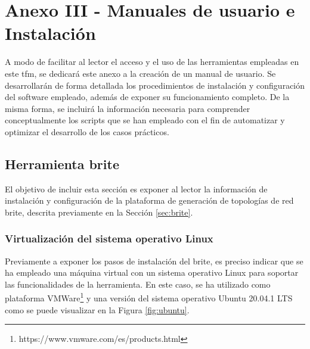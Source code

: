 \chapter{Anexo III - Manuales de usuario e Instalación}

A modo de facilitar al lector el acceso y el uso de las herramientas empleadas en este \gls{tfm}, se dedicará este anexo a la creación de un manual de usuario. Se desarrollarán de forma detallada los procedimientos de instalación y configuración del software empleado, además de exponer su funcionamiento completo. De la misma forma, se incluirá la información necesaria para comprender conceptualmente los scripts que se han empleado con el fin de automatizar y optimizar el desarrollo de los casos prácticos.




\section{Herramienta \acrshort{brite}}
\label{sec:manualbrite}

El objetivo de incluir esta sección es exponer al lector la información de instalación y configuración de la plataforma de generación de topologías de red \gls{brite}, descrita previamente en la Sección \ref{sec:brite}.

\subsection{Virtualización del sistema operativo Linux}
Previamente a exponer los pasos de instalación del \gls{brite}, es preciso indicar que se ha empleado una máquina virtual con un sistema operativo Linux para soportar las funcionalidades de la herramienta. En este caso, se ha utilizado como plataforma VMWare\footnote{https://www.vmware.com/es/products.html} y una versión del sistema operativo Ubuntu 20.04.1 LTS como se puede visualizar en la Figura \ref{fig:ubuntu}.

